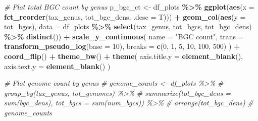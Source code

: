 \documentclass[
]{article}
\newenvironment{Shaded}{\begin{snugshade}}{\end{snugshade}}
\newcommand{\AttributeTok}[1]{\textcolor[rgb]{0.13,0.29,0.53}{#1}}
\newcommand{\CommentTok}[1]{\textcolor[rgb]{0.56,0.35,0.01}{\textit{#1}}}
\newcommand{\DecValTok}[1]{\textcolor[rgb]{0.00,0.00,0.81}{#1}}
\newcommand{\FunctionTok}[1]{\textcolor[rgb]{0.13,0.29,0.53}{\textbf{#1}}}
\newcommand{\NormalTok}[1]{#1}
\newcommand{\OtherTok}[1]{\textcolor[rgb]{0.56,0.35,0.01}{#1}}
\newcommand{\SpecialCharTok}[1]{\textcolor[rgb]{0.81,0.36,0.00}{\textbf{#1}}}
\newcommand{\StringTok}[1]{\textcolor[rgb]{0.31,0.60,0.02}{#1}}
\begin{document}
\begin{Shaded}
\begin{Highlighting}[]
\CommentTok{\# Plot total BGC count by genus}
\NormalTok{p\_bgc\_ct }\OtherTok{\textless{}{-}}\NormalTok{ df\_plots }\SpecialCharTok{\%\textgreater{}\%}
  \FunctionTok{ggplot}\NormalTok{(}\FunctionTok{aes}\NormalTok{(}\AttributeTok{x =} \FunctionTok{fct\_reorder}\NormalTok{(tax\_genus, tot\_bgc\_dens, }\AttributeTok{.desc =}\NormalTok{ T))) }\SpecialCharTok{+}
  \FunctionTok{geom\_col}\NormalTok{(}\FunctionTok{aes}\NormalTok{(}\AttributeTok{y =}\NormalTok{ tot\_bgcs), }\AttributeTok{data =}\NormalTok{ df\_plots }\SpecialCharTok{\%\textgreater{}\%} \FunctionTok{select}\NormalTok{(tax\_genus, tot\_bgcs, tot\_bgc\_dens) }\SpecialCharTok{\%\textgreater{}\%} \FunctionTok{distinct}\NormalTok{()) }\SpecialCharTok{+}
  \FunctionTok{scale\_y\_continuous}\NormalTok{(}
    \AttributeTok{name =} \StringTok{"BGC count"}\NormalTok{,}
    \AttributeTok{trans =} \FunctionTok{transform\_pseudo\_log}\NormalTok{(}\AttributeTok{base =} \DecValTok{10}\NormalTok{),}
    \AttributeTok{breaks =} \FunctionTok{c}\NormalTok{(}\DecValTok{0}\NormalTok{, }\DecValTok{1}\NormalTok{, }\DecValTok{5}\NormalTok{, }\DecValTok{10}\NormalTok{, }\DecValTok{100}\NormalTok{, }\DecValTok{500}\NormalTok{)}
\NormalTok{  ) }\SpecialCharTok{+}
  \FunctionTok{coord\_flip}\NormalTok{() }\SpecialCharTok{+}
  \FunctionTok{theme\_bw}\NormalTok{() }\SpecialCharTok{+}
  \FunctionTok{theme}\NormalTok{(}
    \AttributeTok{axis.title.y =} \FunctionTok{element\_blank}\NormalTok{(),}
    \AttributeTok{axis.text.y =} \FunctionTok{element\_blank}\NormalTok{()}
\NormalTok{  )}

\CommentTok{\# Plot genome count by genus}
\CommentTok{\# genome\_counts \textless{}{-} df\_plots \%\textgreater{}\%}
\CommentTok{\#   group\_by(tax\_genus, tot\_genomes) \%\textgreater{}\%}
\CommentTok{\#   summarize(tot\_bgc\_dens = sum(bgc\_dens), tot\_bgcs = sum(num\_bgcs)) \%\textgreater{}\%}
\CommentTok{\#   arrange(tot\_bgc\_dens)}
\CommentTok{\# genome\_counts}


\end{Highlighting}
\end{Shaded}
\end{document}
